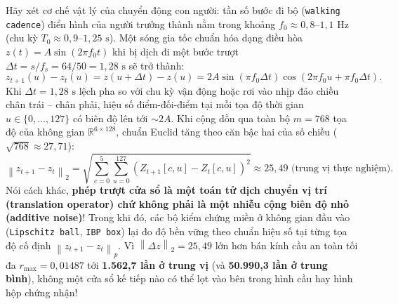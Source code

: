 \documentclass[11pt,a4paper]{article}
\newcommand{\R}{\mathbb{R}}
\newcommand{\norm}[1]{\left\lVert #1\right\rVert}
\newcommand{\code}[1]{{\small\ttfamily\nolinkurl{#1}}}
\begin{document}
Hãy xét cơ chế vật lý của chuyển động con người: tần số bước đi bộ (\code{walking cadence}) điển hình của người trưởng thành nằm trong khoảng $f_0 \approx 0,8\text{--}1,1\text{ Hz}$ (chu kỳ $T_0 \approx 0,9\text{--}1,25\text{ s}$). Một sóng gia tốc chuẩn hóa dạng điều hòa $z(t) = A \sin(2\pi f_0 t)$ khi bị dịch đi một bước trượt $\Delta t = s / f_s = 64 / 50 = 1,28\text{ s}$ sẽ trở thành:
\begin{equation}
  z_{t+1}(u) - z_t(u) = z(u + \Delta t) - z(u) = 2 A \sin(\pi f_0 \Delta t) \cos\!\left(2\pi f_0 u + \pi f_0 \Delta t\right).
\end{equation}
Khi $\Delta t = 1,28\text{ s}$ lệch pha so với chu kỳ vận động hoặc rơi vào nhịp đảo chiều chân trái -- chân phải, hiệu số điểm-đối-điểm tại mỗi tọa độ thời gian $u \in \{0,\dots,127\}$ có biên độ lên tới $\sim 2A$. Khi cộng dồn qua toàn bộ $m = 768$ tọa độ của không gian $\R^{6 \times 128}$, chuẩn Euclid tăng theo căn bậc hai của số chiều ($\sqrt{768} \approx 27,71$):
\begin{equation}
  \norm{z_{t+1} - z_t}_2 = \sqrt{\sum_{c=0}^{5} \sum_{u=0}^{127} \left(Z_{t+1}[c, u] - Z_t[c, u]\right)^2} \approx 25,49 \text{ (trung vị thực nghiệm)}.
\end{equation}
Nói cách khác, \textbf{phép trượt cửa sổ là một toán tử dịch chuyển vị trí (translation operator) chứ không phải là một nhiễu cộng biên độ nhỏ (additive noise)}! Trong khi đó, các bộ kiểm chứng miền ở không gian đầu vào (\code{Lipschitz ball}, \code{IBP box}) lại đo độ bền vững theo chuẩn hiệu số tại từng tọa độ cố định $\norm{z_{t+1} - z_t}_p$. Vì $\norm{\Delta z}_2 = 25,49$ lớn hơn bán kính cầu an toàn tối đa $r_{\max} = 0,01487$ tới \textbf{1.562,7 lần ở trung vị} (và \textbf{50.990,3 lần ở trung bình}), không một cửa sổ kế tiếp nào có thể lọt vào bên trong hình cầu hay hình hộp chứng nhận!
\end{document}
